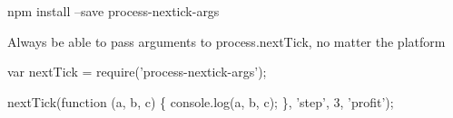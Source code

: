 \href{https://travis-ci.org/calvinmetcalf/process-nextick-args}{\tt }


\begin{DoxyCode}
npm install --save process-nextick-args
\end{DoxyCode}


Always be able to pass arguments to process.\+next\+Tick, no matter the platform


\begin{DoxyCode}
var nextTick = require('process-nextick-args');

nextTick(function (a, b, c) \{
  console.log(a, b, c);
\}, 'step', 3,  'profit');
\end{DoxyCode}
 